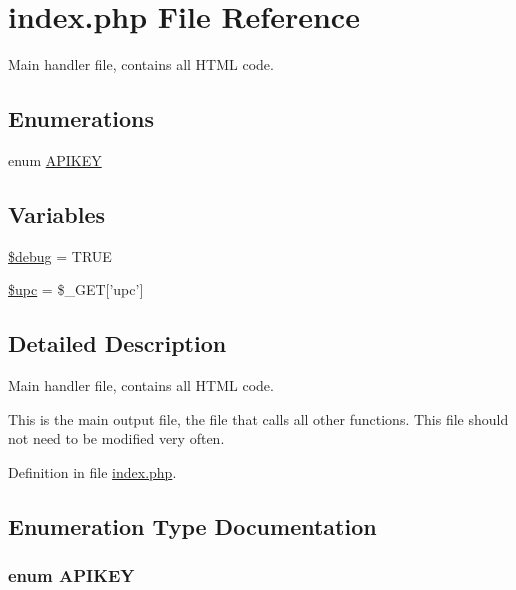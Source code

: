 \hypertarget{index_8php}{
\section{index.php File Reference}
\label{index_8php}
}
Main handler file, contains all HTML code. 

\subsection*{Enumerations}
\begin{CompactItemize}
\item 
enum \hyperlink{index_8php_cb68d0635f57ee9137fb7985a2357c5c}{APIKEY} 
\end{CompactItemize}
\subsection*{Variables}
\begin{CompactItemize}
\item 
\hyperlink{index_8php_85ae3e64cd40e9564adceb010085e9dd}{\$debug} = TRUE
\item 
\hyperlink{index_8php_a9aa17ff51d69075d75cfc5bc4e89b34}{\$upc} = \$\_\-GET\mbox{[}'upc'\mbox{]}
\end{CompactItemize}


\subsection{Detailed Description}
Main handler file, contains all HTML code. 

This is the main output file, the file that calls all other functions. This file should not need to be modified very often. 

Definition in file \hyperlink{index_8php-source}{index.php}.

\subsection{Enumeration Type Documentation}
\hypertarget{index_8php_cb68d0635f57ee9137fb7985a2357c5c}{
\subsubsection{\setlength{\rightskip}{0pt plus 5cm}enum {\bf APIKEY}}}
\label{index_8php_cb68d0635f57ee9137fb7985a2357c5c}


